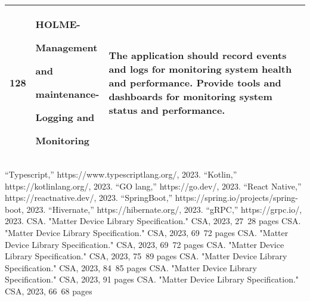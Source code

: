 \documentclass[conference]{IEEEtran}
\begin{document}
\begin{enumerate}
\begin{table}[h]
\begin{tabular}{|p{1cm}|p{1.8cm}|p{5.0cm}|}
        128 \par  & HOLME-\par Management \par and \par maintenance- \par Logging and \par Monitoring & The application should record events and logs for monitoring system health and performance. Provide tools and dashboards for monitoring system status and performance. \\ \hline
    \end{tabular}
\end{table}
\clearpage


\end{enumerate}
\clearpage




\begin{thebibliography}{9}
  “Typescript,” https://www.typescriptlang.org/, 2023.
  “Kotlin,” https://kotlinlang.org/, 2023.
  “GO lang,” https://go.dev/, 2023.
  “React Native,” https://reactnative.dev/, 2023.
  “SpringBoot,” https://spring.io/projects/spring-boot, 2023.
  “Hivernate,” https://hibernate.org/, 2023.
  “gRPC,” https://grpc.io/, 2023.
 CSA. "Matter Device Library Specification." CSA, 2023, 27~28 pages
 CSA. "Matter Device Library Specification." CSA, 2023, 69~72 pages
 CSA. "Matter Device Library Specification." CSA, 2023, 69~72 pages
 CSA. "Matter Device Library Specification." CSA, 2023, 75~89 pages
 CSA. "Matter Device Library Specification." CSA, 2023, 84~85 pages
 CSA. "Matter Device Library Specification." CSA, 2023, 91 pages
 CSA. "Matter Device Library Specification." CSA, 2023, 66~68 pages

\end{thebibliography}
\end{document}
